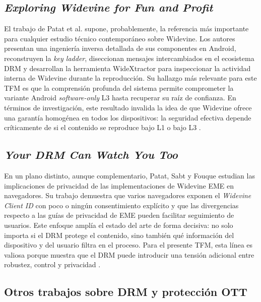 \subsection{\textit{Exploring Widevine for Fun and Profit}}

El trabajo de Patat et al. supone, probablemente, la referencia más importante para cualquier estudio técnico contemporáneo sobre Widevine. Los autores presentan una ingeniería inversa detallada de sus componentes en Android, reconstruyen la \textit{key ladder}, diseccionan mensajes intercambiados en el ecosistema DRM y desarrollan la herramienta WideXtractor para inspeccionar la actividad interna de Widevine durante la reproducción. Su hallazgo más relevante para este TFM es que la comprensión profunda del sistema permite comprometer la variante Android \textit{software-only} L3 hasta recuperar su raíz de confianza. En términos de investigación, este resultado invalida la idea de que Widevine ofrece una garantía homogénea en todos los dispositivos: la seguridad efectiva depende críticamente de si el contenido se reproduce bajo L1 o bajo L3 \cite{patat2022}.

\subsection{\textit{Your DRM Can Watch You Too}}

En un plano distinto, aunque complementario, Patat, Sabt y Fouque estudian las implicaciones de privacidad de las implementaciones de Widevine EME en navegadores. Su trabajo demuestra que varios navegadores exponen el \textit{Widevine Client ID} con poco o ningún consentimiento explícito y que las divergencias respecto a las guías de privacidad de EME pueden facilitar seguimiento de usuarios. Este enfoque amplía el estado del arte de forma decisiva: no solo importa si el DRM protege el contenido, sino también qué información del dispositivo y del usuario filtra en el proceso. Para el presente TFM, esta línea es valiosa porque muestra que el DRM puede introducir una tensión adicional entre robustez, control y privacidad \cite{patat2023,w3ceme2026}.

\subsection{Otros trabajos sobre DRM y protección OTT}

